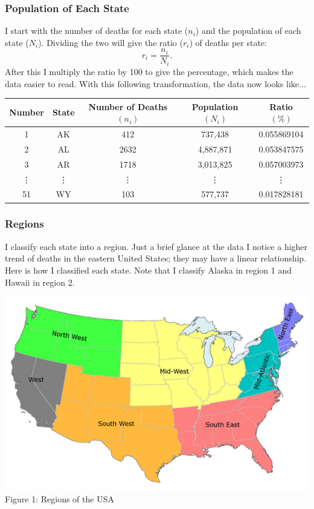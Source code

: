 \documentclass[10pt]{beamer}
\begin{document}
\begin{frame}
	\frametitle{Population of Each State}
I start with the number of deaths for each state ($n_i$) and the population of each state ($N_i$). Dividing the two will give the ratio ($r_i$) of deaths per state: $$r_i=\frac{n_i}{N_i}.$$ After this I multiply the ratio by 100 to give the percentage, which makes the data easier to read. With this following transformation, the data now looks like...
	\begin{center}
	\begin{adjustbox}{width=\columnwidth,center}
	\begin{tabular}{|c|c|c|c|c|}
		\hline
		Number & State & Number of Deaths $(n_i)$ & Population $(N_i)$ & Ratio $(\%)$\\
		\hline
		1 & AK & 412 & 737,438 & 0.055869104\\
		\hline
		2 & AL & 2632 & 4,887,871 & 0.053847575\\
		\hline
		3 & AR & 1718 & 3,013,825 & 0.057003973\\
		\hline
		\vdots & \vdots & \vdots & \vdots & \vdots\\
		\hline
		51 & WY & 103 & 577,737 & 0.017828181\\
		\hline
	\end{tabular}
	\end{adjustbox}
	\end{center}
\end{frame}

\begin{frame}
\frametitle{Regions}
	I classify each state into a region. Just a brief glance at the data I notice a higher trend of deaths in the eastern United States; they may have a linear relationship. Here is how I classified each state. Note that I classify Alaska in region 1 and Hawaii in region 2.
	\begin{center}
	\includegraphics[scale=0.25]{regions.png}\\
	Figure 1: Regions of the USA\cite{region}
	\end{center}
\end{frame}
\end{document}
